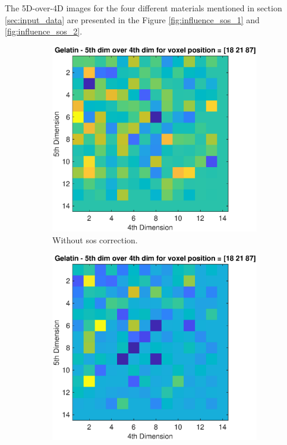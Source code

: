 The 5D-over-4D images for the four different materials mentioned in section \ref{sec:input_data} are presented in the Figure \ref{fig:influence_sos_1} and \ref{fig:influence_sos_2}.
\begin{figure}[H]
     \centering
     \begin{subfigure}[b]{0.47\textwidth}
         \centering
         \includegraphics[width=1.02\linewidth,left]{Graphics/Results/14_vecs_sos_vs_noSos/5thdim_over4D_no_sos_pulp.eps}
         \caption{Without \ac{sos} correction. }
         \label{leer}
     \end{subfigure}
     \hfill
     \begin{subfigure}[b]{0.47\textwidth}
         \centering
         \includegraphics[width=1.02\textwidth]{Graphics/Results/14_vecs_sos_vs_noSos/5thdim_over4D_with_sos_pulp.eps}

\end{subfigure}
\end{figure}
